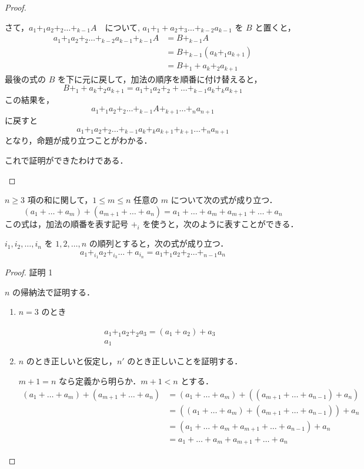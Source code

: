 \documentclass[leqno,autodetect-engine, dvipdfmx-if-dvi,ja=standard]{bxjsarticle}
\begin{document}
\begin{proof}
\begin{enumerate}
\begin{enumerate}
						さて，$a_1 +_1 a_2 +_2 \dots +_{k-1} A$　について, $a_1 +_1 + a_2 +_3 \dots +_{k-2} a_{k-1}$ を $B$ と置くと，
						\begin{align}
						a_1 +_1 a_2 +_2 \dots +_{k-2} a_{k-1} +_{k-1} A &= B +_{k-1} A \\
						&= B +_{k-1} (a_k +_1 a_{k+1} ) \\
						&= B +_1 + a_k +_2 a_{k+1}
						\end{align}
						最後の式の $B$ を下に元に戻して，加法の順序を順番に付け替えると，
						\[
						B +_1 + a_k +_2 a_{k+1} = a_1 +_1 a_2 +_2 + \dots +_{k-1} a_k +_k a_{k+1}
						\]
						この結果を，
						\[
						a_1 +_1 a_2 +_2 \dots +_{k-1} A +_{k+1} \dots +_{n} a_{n+1}
						\]
						に戻すと
						\[
						a_1 +_1 a_2 +_2 \dots +_{k-1} a_k +_k a_{k+1} +_{k+1} \dots +_{n} a_{n+1}
						\]
						となり，命題が成り立つことがわかる．
				\end{enumerate}
				これで証明ができたわけである．
		\end{enumerate}
	\end{proof}




	\begin{thm}[一般結合法則] $n \ge 3$ 項の和に関して，$1 \le m \le n $ 任意の $m$ について次の式が成り立つ．
		\begin{equation}
			(a_1 + \dots + a_m) + (a_{m+1} + \dots + a_n) = a_1 + \dots + a_m + a_{m+1} + \dots + a_n
		\end{equation}
		この式は，加法の順番を表す記号 $+_i$ を使うと，次のように表すことができる．

		$i_1,i_2,\dots,i_n$ を $1,2,\dots,n$ の順列とすると，次の式が成り立つ．
		\[
		a_1 +_{i_1} a_2 +_{i_3} \dots + a_{i_n} = a_1 +_1  a_2 +_2 \dots +_{n-1} a_n
		\]
	\end{thm}
	\begin{proof} 証明 1

		$n$ の帰納法で証明する．
		\begin{enumerate}
		\item $n=3$ のとき

			\begin{align}
				a_1 +_{1}  a_2 +_{2} a_3 = (a_1 + a_2) + a_3 \\
				a_1
			\end{align}

		\item $n$ のとき正しいと仮定し，$n'$ のとき正しいことを証明する．

		$m+1=n$ なら定義から明らか．$m+1 <n$ とする．
		\begin{align}
			(a_1 + \dots + a_m) + (a_{m+1} + \dots + a_n) &= (a_1 + \dots + a_m) + ((a_{m+1} + \dots + a_{n-1}) + a_n) \\
			&= ((a_1 + \dots + a_m) + (a_{m+1} + \dots + a_{n-1})) + a_n \\
			&= (a_1 + \dots + a_m + a_{m+1} + \dots + a_{n-1}) + a_n \\
			&= a_1 + \dots + a_m + a_{m+1} + \dots + a_n
		\end{align}

		\end{enumerate}
	\end{proof}
\end{document}
